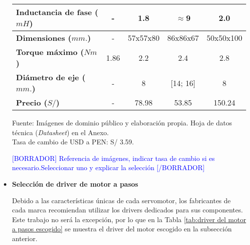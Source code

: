 \begin{itemize}
\begin{mytable}[H]
\begin{tabular}{l|c|c|c|c|}
			\multicolumn{1}{|l|}{\textbf{Inductancia de fase ($mH$)}}& - & 1.8 & $\approx$9 & 2.0 \\ \hline
			\multicolumn{1}{|l|}{\textbf{Dimensiones ($mm.$)}}& - & 57x57x80 & 86x86x67 & 50x50x100 \\ \hline
			\multicolumn{1}{|l|}{\textbf{Torque máximo ($Nm$)}}& 1.86 & 2.2 & 2.4 & 2.8 \\ \hline
			\multicolumn{1}{|l|}{\textbf{Diámetro de eje ($mm.$)}}& - & 8 & [14; 16] & 8 \\ \hline
			\multicolumn{1}{|l|}{\textbf{Precio ($S/$)}}& - & 78.98 & 53.85 & 150.24 \\ \hline
		\end{tabular}
		\begin{myflushcenteraftertable}	
			Fuente: Imágenes de dominio público y elaboración propia. Hoja de datos técnica (\textit{Datasheet}) en el Anexo. \\
			Tasa de cambio de USD a PEN: S/ 3.59.
		\end{myflushcenteraftertable}
	\end{mytable}
	
	\textcolor{blue}{[BORRADOR] Referencia de imágenes, indicar tasa de cambio si es necesario.Seleccionar uno y explicar la selección [/BORRADOR]}	
	
	\item \textbf{Selección de driver de motor a pasos}
	
	Debido a las características únicas de cada servomotor, los fabricantes de cada marca recomiendan utilizar los drivers dedicados para sus componentes. Este trabajo no será la excepción, por lo que en la Tabla \ref{tab:driver del motor a pasos escogido} se muestra el driver del motor escogido en la subsección anterior.
	

\end{itemize}
